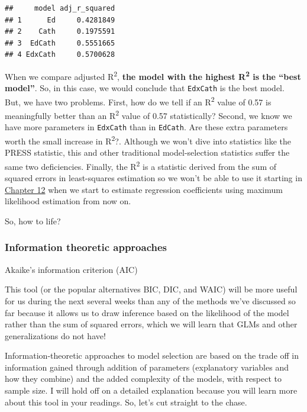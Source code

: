 \documentclass[
]{book}
\begin{document}
\begin{verbatim}
##     model adj_r_squared
## 1      Ed     0.4281849
## 2    Cath     0.1975591
## 3  EdCath     0.5551665
## 4 EdxCath     0.5700628
\end{verbatim}

When we compare adjusted R\textsuperscript{2}, \textbf{the model with the highest R\textsuperscript{2} is the ``best model''}. So, in this case, we would conclude that \texttt{EdxCath} is the best model. But, we have two problems. First, how do we tell if an R\textsuperscript{2} value of 0.57 is meaningfully better than an R\textsuperscript{2} value of 0.57 statistically? Second, we know we have more parameters in \texttt{EdxCath} than in \texttt{EdCath}. Are these extra parameters worth the small increase in R\textsuperscript{2}?. Although we won't dive into statistics like the PRESS statistic, this and other traditional model-selection statistics suffer the same two deficiencies. Finally, the R\textsuperscript{2} is a statistic derived from the sum of squared errors in least-squares estimation so we won't be able to use it starting in \protect\hyperlink{Chapter12}{Chapter 12} when we start to estimate regression coefficients using maximum likelihood estimation from now on.

So, how to life?

\hypertarget{information-theoretic-approaches}{%
\subsubsection{Information theoretic approaches}\label{information-theoretic-approaches}}

Akaike's information criterion (AIC)

This tool (or the popular alternatives BIC, DIC, and WAIC) will be more useful for us during the next several weeks than any of the methods we've discussed so far because it allows us to draw inference based on the likelihood of the model rather than the sum of squared errors, which we will learn that GLMs and other generalizations do not have!

Information-theoretic approaches to model selection are based on the trade off in information gained through addition of parameters (explanatory variables and how they combine) and the added complexity of the models, with respect to sample size. I will hold off on a detailed explanation because you will learn more about this tool in your readings. So, let's cut straight to the chase.
\end{document}
